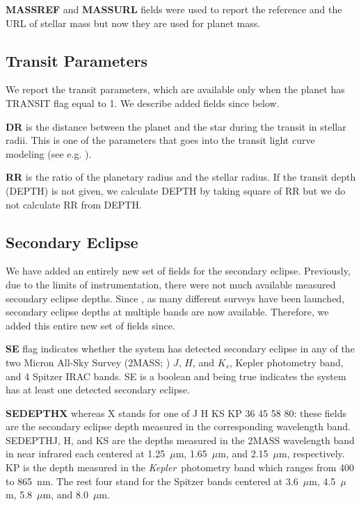 \documentclass[11pt,preprint]{aastex}
\def\micron{$\mu$m}
\def\kepler{\textit{Kepler}}
\def\micron{$\mu$m}
\begin{document}
\begin{CJK*}{UTF8}{gbsn}
{\bf MASSREF} and {\bf MASSURL} fields were used to report the
reference and the URL of stellar mass but now they are used for planet
mass.

\subsection{Transit Parameters}\label{sec:transit}

We report the transit parameters, which are available only when the
planet has TRANSIT flag equal to 1. We describe added fields since
\cite{Wright2011} below.

{\bf DR} is the distance between the planet and the star during the
transit in stellar radii. This is one of the parameters that goes into
the transit light curve modeling (see e.g. \citealt{Batalha2013}).

{\bf RR} is the ratio of the planetary radius and the stellar
radius. If the transit depth (DEPTH) is not given, we calculate DEPTH
by taking square of RR but we do not calculate RR from DEPTH.


\subsection{Secondary Eclipse}\label{sec:se}

We have added an entirely new set of fields for the secondary
eclipse. Previously, due to the limits of instrumentation, there were
not much available measured secondary eclipse depths. Since
\cite{Wright2011}, as many different surveys have been launched,
secondary eclipse depths at multiple bands are now
available. Therefore, we added this entire new set of fields since.

{\bf SE} flag indicates whether the system has detected secondary
eclipse in any of the two Micron All-Sky Survey (2MASS;
\citealt{Skrustskie2006}) $J$, $H$, and $K_s$, Kepler photometry band,
and 4 Spitzer IRAC bands. SE is a boolean and being true indicates the
system has at least one detected secondary eclipse.

{\bf SEDEPTHX} whereas X stands for one of J H KS KP 36 45 58 80:
these fields are the secondary eclipse depth measured in the
corresponding wavelength band. SEDEPTHJ, H, and KS are the depths
measured in the 2MASS wavelength band in near infrared each centered
at 1.25~\micron, 1.65~\micron, and 2.15~\micron, respectively. KP is
the depth measured in the \kepler\ photometry band which ranges from
400 to 865~nm. The rest four stand for the Spitzer bands centered at
3.6~\micron, 4.5~\micron, 5.8~\micron, and 8.0~\micron.


\end{CJK*}
\end{document}
